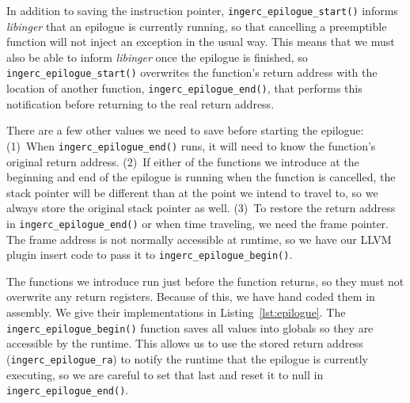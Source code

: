 In addition to saving the instruction pointer, \texttt{ingerc\_epilogue\_start()}
informs \textit{libinger} that an epilogue is currently running, so that cancelling a
preemptible function will not inject an exception in the usual way.  This means that
we must also be able to inform \textit{libinger} once the epilogue is finished, so
\texttt{ingerc\_epilogue\_start()} overwrites the function's return address with the
location of another function, \texttt{ingerc\_epilogue\_end()}, that performs this
notification before returning to the real return address.

\begin{sloppypar}
There are a few other values we need to save before starting the epilogue:  (1)~When
\texttt{ingerc\_epilogue\_end()} runs, it will need to know the function's original
return address.  (2)~If either of the functions we introduce at the beginning and end
of the epilogue is running when the function is cancelled, the stack pointer will be
different than at the point we intend to travel to, so we always store the original
stack pointer as well.  (3)~To restore the return address in
\texttt{ingerc\_epilogue\_end()} or when time traveling, we need the frame pointer.
The frame address is not normally accessible at runtime, so
we have our LLVM plugin insert code to pass it to \texttt{ingerc\_epilogue\_begin()}.
\end{sloppypar}

The functions we introduce run just before the function returns, so they must not
overwrite any return registers.  Because of this, we have hand coded them in
assembly.  We give their implementations in Listing~\ref{lst:epilogue}.  The
\texttt{ingerc\_epilogue\_begin()} function saves all values into globals so they are
accessible by the runtime.  This allows us to use the stored return address
(\texttt{ingerc\_epilogue\_ra}) to notify the runtime that the epilogue is currently
executing, so we are careful to set that last and reset it to null in
\texttt{ingerc\_epilogue\_end()}.

